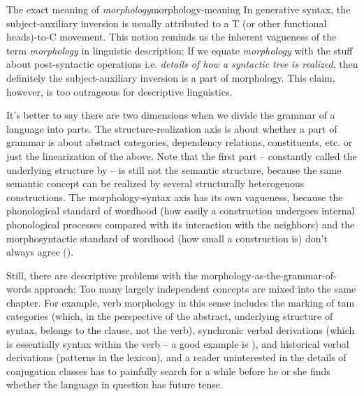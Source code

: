 \documentclass[UTF8, a4paper, oneside, scheme=plain]{ctexrep}
\newcommand*{\term}[1]{\emph{#1}}
\begin{document}
\begin{theorybox}{The exact meaning of \term{morphology}}{morphology-meaning}
    In generative syntax, the subject-auxiliary inversion is usually attributed to 
    a T (or other functional heads)-to-C movement.
    This notion reminds us the inherent vagueness of the term \term{morphology} in linguistic description:
    If we equate \term{morphology} with the stuff about post-syntactic operations 
    i.e. \emph{details of how a syntactic tree is realized},
    then definitely the subject-auxiliary inversion is a part of morphology.
    This claim, however, is too outrageous for descriptive linguistics.

    It's better to say there are two dimensions 
    when we divide the grammar of a language into parts.
    The structure-realization axis is about 
    whether a part of grammar is about abstract categories, dependency relations, constituents, etc. 
    or just the linearization of the above.
    Note that the first part -- constantly called the underlying structure by \citet{dixon2009basic1} 
    -- is still not the semantic structure,
    because the same semantic concept can be realized by several structurally heterogenous constructions.
    The morphology-syntax axis has its own vagueness,
    because the phonological standard of wordhood 
    (how easily a construction undergoes internal phonological processes 
    compared with its interaction with the neighbors)
    and the morphosyntactic standard of wordhood 
    (how small a construction is)
    don't always agree ().

    Still, there are descriptive problems with the morphology-as-the-grammar-of-words approach:
    Too many largely independent concepts are mixed into the same chapter.
    For example, verb morphology in this sense includes 
    the marking of \acs{tam} categories 
    (which, in the perspective of the abstract, underlying structure of syntax, 
    belongs to the clause, not the verb),
    synchronic verbal derivations 
    (which is essentially syntax within the verb -- a good example is \citet{de2019negation}),
    and historical verbal derivations 
    (patterns in the lexicon),
    and a reader uninterested in the details of conjugation classes 
    has to painfully search for a while before he or she finds 
    whether the language in question has future tense.


\end{theorybox}
\end{document}

